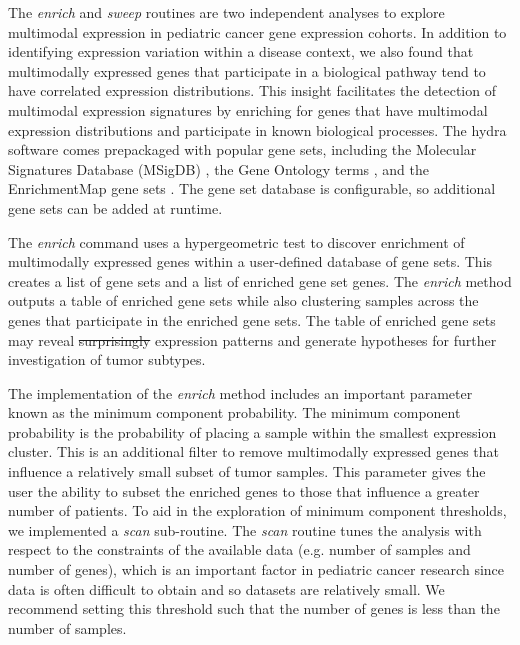 \documentclass[10pt,letterpaper]{article}
\providecommand{\DIFaddtex}[1]{{\protect\color{blue}\uwave{#1}}} %
\providecommand{\DIFdeltex}[1]{{\protect\color{red}\sout{#1}}}                      %
\providecommand{\DIFaddbegin}{} %
\providecommand{\DIFaddend}{} %
\providecommand{\DIFdelbegin}{} %
\providecommand{\DIFdelend}{} %
\providecommand{\DIFadd}[1]{\texorpdfstring{\DIFaddtex{#1}}{#1}} %
\providecommand{\DIFdel}[1]{\texorpdfstring{\DIFdeltex{#1}}{}} %
\newcommand{\DIFscaledelfig}{0.5}
\newlength{\DIFdelgraphicswidth} %
\newlength{\DIFdelgraphicsheight} %
\newcommand{\DIFaddincludegraphics}[2][]{{\color{blue}\fbox{\DIFOincludegraphics[#1]{#2}}}} %
\newcommand{\DIFdelincludegraphics}[2][]{%
\sbox{\DIFdelgraphicsbox}{\DIFOincludegraphics[#1]{#2}}%
\settoboxwidth{\DIFdelgraphicswidth}{\DIFdelgraphicsbox} %
\settoboxtotalheight{\DIFdelgraphicsheight}{\DIFdelgraphicsbox} %
\scalebox{\DIFscaledelfig}{%
\parbox[b]{\DIFdelgraphicswidth}{\usebox{\DIFdelgraphicsbox}\\[-\baselineskip] \rule{\DIFdelgraphicswidth}{0em}}\llap{\resizebox{\DIFdelgraphicswidth}{\DIFdelgraphicsheight}{%
\setlength{\unitlength}{\DIFdelgraphicswidth}%
\begin{picture}(1,1)%
\thicklines\linethickness{2pt} %
{\color[rgb]{1,0,0}\put(0,0){\framebox(1,1){}}}%
{\color[rgb]{1,0,0}\put(0,0){\line( 1,1){1}}}%
{\color[rgb]{1,0,0}\put(0,1){\line(1,-1){1}}}%
\end{picture}%
}\hspace*{3pt}}} %
} %
\DeclareRobustCommand{\DIFaddbegin}{\DIFOaddbegin \let\includegraphics\DIFaddincludegraphics} %
\DeclareRobustCommand{\DIFaddend}{\DIFOaddend \let\includegraphics\DIFOincludegraphics} %
\DeclareRobustCommand{\DIFdelbegin}{\DIFOdelbegin \let\includegraphics\DIFdelincludegraphics} %
\DeclareRobustCommand{\DIFdelend}{\DIFOaddend \let\includegraphics\DIFOincludegraphics} %
\begin{document}
\DIFaddend The \textit{enrich} and \textit{sweep} routines are two independent analyses to explore multimodal expression in pediatric cancer gene expression cohorts. In addition to identifying expression variation within a disease context, we also found that multimodally expressed genes that participate in a biological pathway tend to have correlated expression distributions. This insight facilitates the detection of multimodal expression signatures by enriching for genes that have multimodal expression distributions and participate in known biological processes. The hydra software comes prepackaged with popular gene sets, including the Molecular Signatures Database (MSigDB) \cite{liberzonMolecularSignaturesDatabase2011}, the Gene Ontology terms \cite{Ashburner2000, gene2018gene}, and the EnrichmentMap gene sets \cite{merico2010enrichment}. The gene set database is configurable, so additional gene sets can be added at runtime.

The \textit{enrich} command uses a hypergeometric test \cite{yuClusterProfilerPackageComparing2012} to discover enrichment of multimodally expressed genes within a user-defined database of gene sets. This creates a list of gene sets and a list of enriched gene set genes. The \textit{enrich} method outputs a table of enriched gene sets while also clustering samples across the genes that participate in the enriched gene sets. The table of enriched gene sets may reveal \DIFdelbegin \DIFdel{surprisingly }\DIFdelend \DIFaddbegin \DIFadd{surprising }\DIFaddend expression patterns and generate hypotheses for further investigation of tumor subtypes. 
\DIFaddbegin 

\DIFaddend The implementation of the \textit{enrich} method includes an important parameter known as the minimum component probability. The minimum component probability is the probability of placing a sample within the smallest expression cluster. This is an additional filter to remove multimodally expressed genes that influence a relatively small subset of tumor samples. This parameter gives the user the ability to subset the enriched genes to those that influence a greater number of patients. To aid in the exploration of minimum component thresholds, we implemented a \textit{scan} sub-routine. The \textit{scan} routine tunes the analysis with respect to the constraints of the available data (e.g. number of samples and number of genes), which is an important factor in pediatric cancer research since data is often difficult to obtain and so datasets are relatively small. We recommend setting this threshold such that the number of genes is less than the number of samples. 
\end{document}
